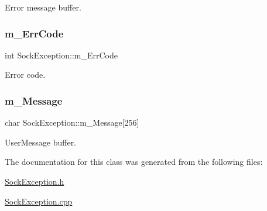 Error message buffer. 

\mbox{\label{classSockException_aa0b3cd8672ed45e8f61f0c94517d237c}} 
\subsubsection{\texorpdfstring{m\+\_\+\+Err\+Code}{m\_ErrCode}}
{\footnotesize\ttfamily int Sock\+Exception\+::m\+\_\+\+Err\+Code\hspace{0.3cm}{\ttfamily [protected]}}



Error code. 

\mbox{\label{classSockException_ac9190a7ac09341189d5dfab54430c258}} 
\subsubsection{\texorpdfstring{m\+\_\+\+Message}{m\_Message}}
{\footnotesize\ttfamily char Sock\+Exception\+::m\+\_\+\+Message\mbox{[}256\mbox{]}\hspace{0.3cm}{\ttfamily [protected]}}



User\+Message buffer. 



The documentation for this class was generated from the following files\+:\begin{DoxyCompactItemize}
\item 
\hyperlink{SockException_8h}{Sock\+Exception.\+h}\item 
\hyperlink{SockException_8cpp}{Sock\+Exception.\+cpp}\end{DoxyCompactItemize}

